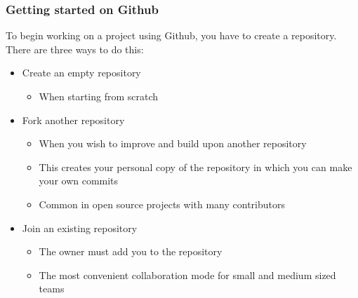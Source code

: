 \begin{frame}

\frametitle{Getting started on Github}

To begin working on a project using Github, you have to create a repository. There are three ways to do this:

\begin{itemize}
	\item Create an empty repository
	\begin{itemize}
	\item When starting from scratch
	\end{itemize}	
	
	\medskip
	\item Fork another repository
	\begin{itemize}
	\item When you wish to improve and build upon another repository
	\item This creates your personal copy of the repository in which you can make your own commits
	\item Common in open source projects with many contributors
	\end{itemize}
	
	\medskip
	\item \alert{Join an existing repository}
	\begin{itemize}
	\item The owner must add you to the repository
	\item The most convenient collaboration mode for small and medium sized teams
	\end{itemize}
\end{itemize}

\end{frame}


